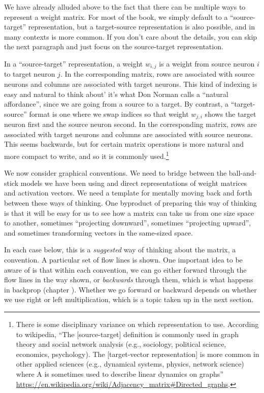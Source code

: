 We have already alluded above to the fact that there can be multiple ways to represent a weight matrix. For most of the book, we simply default to a ``source-target'' representation, but a target-source representation is also possible, and in many contexts is more common. If you don't care about the details, you can skip the next paragraph and just focus on the source-target representation.

In a ``source-target'' representation, a weight $w_{i, j}$ is a weight from source neuron $i$ to target neuron $j$. In the corresponding matrix, rows are associated with source neurons and columns are associated with target neurons. This kind of indexing is easy and natural to think about' it's what Don Norman calls a ``natural affordance'', since we are going from a source to a target.  By contrast,  a ``target-source'' format is one where we swap indices so that weight $w_{j, i}$ shows the target neuron first and the source neuron second.  In the corresponding matrix, rows are associated with target neurons and columns are associated with source neurons. This seems backwards, but for certain matrix operations is more natural and more compact to write, and so it is commonly used.\footnote{There is some disciplinary variance on which representation to use. According to wikipedia, ``The [source-target] definition is commonly used in graph theory and social network analysis (e.g., sociology, political science, economics, psychology). The [target-vector representation] is more common in other applied sciences (e.g., dynamical systems, physics, network science) where A is sometimes used to describe linear dynamics on graphs'' \url{https://en.wikipedia.org/wiki/Adjacency_matrix\#Directed_graphs}.}

We now consider graphical conventions. We need to bridge between the ball-and-stick models we have been using and direct representations of weight matrices and activation vectors. We need a template for mentally moving back and forth between these ways of thinking. One byproduct of preparing this way of thinking is that it will be easy for us to see how a matrix can take us from one size space to another, sometimes ``projecting downward'', sometimes ``projecting upward'', and sometimes transforming vectors in the same-sized space.

In each case below, this is a \emph{suggested} way of thinking about the matrix, a convention.  A particular set of flow lines is shown.  One important idea to be aware of is that within each convention, we can go either forward through the flow lines in the way shown, or \emph{backwards} through them, which is what happens in backprop (chapter ).  Whether we go forward or backward depends on whether we use right or left multiplication, which is a topic taken up in the next section.

